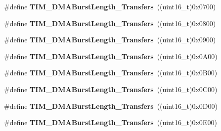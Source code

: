 \begin{DoxyCompactItemize}
\#define {\bfseries T\+I\+M\+\_\+\+D\+M\+A\+Burst\+Length\+\_\+Transfers}~((uint16\+\_\+t)0x0700)
\item 
\mbox{\label{group___t_i_m___d_m_a___burst___length_ga98b208205c133557a9d67a0921559a66}} 
\#define {\bfseries T\+I\+M\+\_\+\+D\+M\+A\+Burst\+Length\+\_\+Transfers}~((uint16\+\_\+t)0x0800)
\item 
\mbox{\label{group___t_i_m___d_m_a___burst___length_ga2fc09f2148cf6ebddc8e67116212259c}} 
\#define {\bfseries T\+I\+M\+\_\+\+D\+M\+A\+Burst\+Length\+\_\+Transfers}~((uint16\+\_\+t)0x0900)
\item 
\mbox{\label{group___t_i_m___d_m_a___burst___length_ga0ca63a3caeaf1e85bd54961891949de7}} 
\#define {\bfseries T\+I\+M\+\_\+\+D\+M\+A\+Burst\+Length\+\_\+Transfers}~((uint16\+\_\+t)0x0\+A00)
\item 
\mbox{\label{group___t_i_m___d_m_a___burst___length_ga9160d52913bbd7ad1e663ff943d01852}} 
\#define {\bfseries T\+I\+M\+\_\+\+D\+M\+A\+Burst\+Length\+\_\+Transfers}~((uint16\+\_\+t)0x0\+B00)
\item 
\mbox{\label{group___t_i_m___d_m_a___burst___length_ga11485e9eee8a6a7edc1df868755eab85}} 
\#define {\bfseries T\+I\+M\+\_\+\+D\+M\+A\+Burst\+Length\+\_\+Transfers}~((uint16\+\_\+t)0x0\+C00)
\item 
\mbox{\label{group___t_i_m___d_m_a___burst___length_gab1a097ca7404e518839df99795443fb0}} 
\#define {\bfseries T\+I\+M\+\_\+\+D\+M\+A\+Burst\+Length\+\_\+Transfers}~((uint16\+\_\+t)0x0\+D00)
\item 
\mbox{\label{group___t_i_m___d_m_a___burst___length_gad13373f5fd246557a4fc487dc43c37ec}} 
\#define {\bfseries T\+I\+M\+\_\+\+D\+M\+A\+Burst\+Length\+\_\+Transfers}~((uint16\+\_\+t)0x0\+E00)
\item 
\mbox{\label{group___t_i_m___d_m_a___burst___length_gafb644e6033f7b46c602b02754b69fde0}} 

\end{DoxyCompactItemize}
